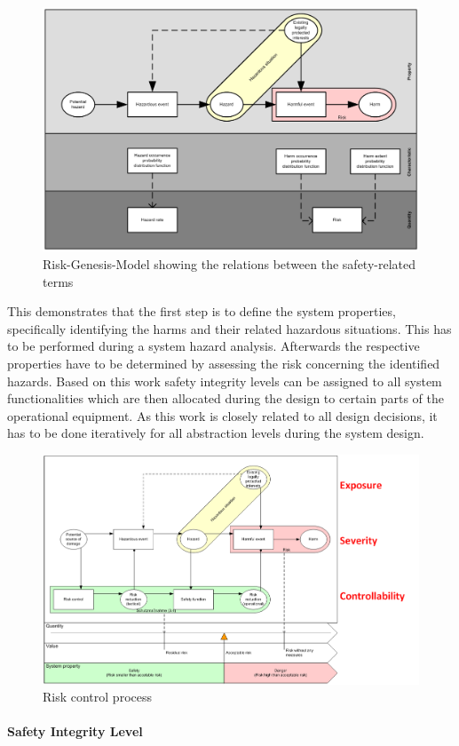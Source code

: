 \documentclass{template/openetcs_report}
\begin{document}
\begin{figure}[htbp]
\centering
\includegraphics[width=0.7\linewidth]{bld_2013-06-19_Risiko-Genese-Modell-eng-2-0_jw}
\caption{Risk-Genesis-Model showing the relations between the safety-related terms \cite{Schnieder.2010}}
\label{fig:Risiko-Genese-Modell-eng}
\end{figure}

This demonstrates that the first step is to define the system properties, specifically identifying the harms and their related hazardous situations. This has to be performed during a system hazard analysis. Afterwards the respective properties have to be determined by assessing the risk concerning the identified hazards. Based on this work safety integrity levels can be assigned to all system functionalities which are then allocated during the design to certain parts of the operational equipment. As this work is closely related to all design decisions, it has to be done iteratively for all abstraction levels during the system design. 

\begin{figure}[htbp]
\centering
\includegraphics[width=0.7\linewidth]{bld_2013-06-19_Risk-control-modell_1-0_jw}
\caption{Risk control process \cite{Schnieder.2013}}
\label{fig:Risk-control-modell-eng}
\end{figure}

\paragraph{Safety Integrity Level}
\end{document}
